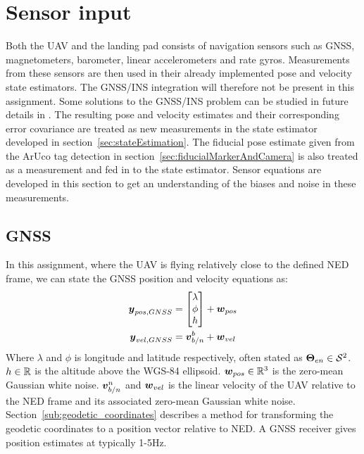\section{Sensor input}\label{sec:sensor_input}

Both the UAV and the landing pad consists of navigation sensors such as GNSS, magnetometers, barometer, linear accelerometers and rate gyros. Measurements from these sensors are then used in their already implemented pose and velocity state estimators. The \gls{GNSS}/\gls{INS} integration will therefore not be present in this assignment. Some solutions to the \gls{GNSS}/\gls{INS} problem can be studied in future details in \cite{vik2009integrated}. The resulting pose and velocity estimates and their corresponding error covariance are treated as new measurements in the state estimator developed in section~\ref{sec:stateEstimation}. The fiducial pose estimate given from the ArUco tag detection in section~\ref{sec:fiducialMarkerAndCamera} is also treated as a measurement and fed in to the state estimator. Sensor equations are developed in this section to get an understanding of the biases and noise in these measurements.


\subsection{GNSS}\label{sec:gnss}
In this assignment, where the UAV is flying relatively close to the defined NED frame, we can state the \gls{GNSS} position and velocity equations as: 
\begin{align}
  \boldsymbol{y}_{pos,GNSS}&=
  \begin{bmatrix}
    \lambda\\
    \phi\\
    h
  \end{bmatrix}
  +\boldsymbol{w}_{pos}\\
  \boldsymbol{y}_{vel,GNSS}&=\boldsymbol{v}_{b/n}^{b}+\boldsymbol{w}_{vel}
\end{align}
Where $\lambda$ and $\phi$ is longitude and latitude respectively, often stated as $\boldsymbol{\Theta}_{en} \in \mathcal{S}^2$. $h\in \mathbb{R}$ is the altitude above the WGS-84 ellipsoid. $\boldsymbol{w}_{pos} \in \mathbb{R}^3$ is the zero-mean Gaussian white noise. $\boldsymbol{v}_{b/n}^{n}$ and $\boldsymbol{w}_{vel}$ is the linear velocity of the UAV relative to the NED frame and its associated zero-mean Gaussian white noise. Section~\ref{sub:geodetic_coordinates} describes a method for transforming the geodetic coordinates to a position vector relative to NED. A \gls{GNSS} receiver gives position estimates at typically 1-5Hz.


